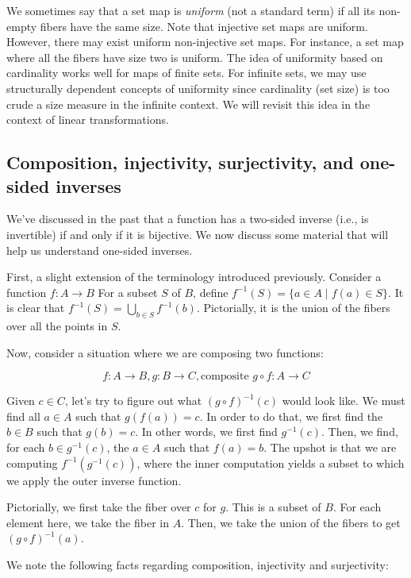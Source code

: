 \documentclass[10pt]{amsart}
\begin{document}
We sometimes say that a set map is {\em uniform} (not a standard term)
if all its non-empty fibers have the same size. Note that injective
set maps are uniform. However, there may exist uniform non-injective
set maps. For instance, a set map where all the fibers have size two
is uniform. The idea of uniformity based on cardinality works well for
maps of finite sets. For infinite sets, we may use structurally
dependent concepts of uniformity since cardinality (set size) is too
crude a size measure in the infinite context. We will revisit this
idea in the context of linear transformations.

\subsection{Composition, injectivity, surjectivity, and one-sided inverses}

We've discussed in the past that a function has a two-sided inverse
(i.e., is invertible) if and only if it is bijective. We now discuss
some material that will help us understand one-sided inverses.

First, a slight extension of the terminology introduced
previously. Consider a function $f:A \to B$ For a subset $S$ of $B$,
define $f^{-1}(S) = \{ a \in A \mid f(a) \in S \}$. It is clear that
$f^{-1}(S) = \bigcup_{b \in S} f^{-1}(b)$. Pictorially, it is the
union of the fibers over all the points in $S$.

Now, consider a situation where we are composing two functions:

$$f: A \to B, g: B \to C, \text{composite } g \circ f: A \to C$$

Given $c \in C$, let's try to figure out what $(g \circ f)^{-1}(c)$
would look like. We must find all $a \in A$ such that $g(f(a)) =
c$. In order to do that, we first find the $b \in B$ such that $g(b) =
c$. In other words, we first find $g^{-1}(c)$. Then, we find, for each
$b \in g^{-1}(c)$, the $a \in A$ such that $f(a) = b$. The upshot is
that we are computing $f^{-1}(g^{-1}(c))$, where the inner computation
yields a subset to which we apply the outer inverse function.

Pictorially, we first take the fiber over $c$ for $g$. This is a
subset of $B$. For each element here, we take the fiber in $A$. Then,
we take the union of the fibers to get $(g \circ f)^{-1}(a)$.

We note the following facts regarding composition, injectivity and
surjectivity:
\end{document}
